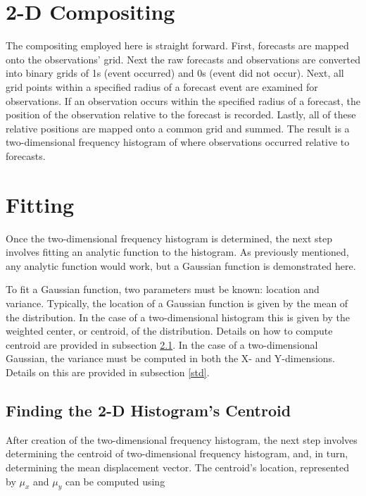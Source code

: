 \section{2-D Compositing}
\label{compositing}

The compositing employed here is straight forward.
First, forecasts are mapped onto the observations' grid.
Next the raw forecasts and observations are converted into binary grids of 1s (event occurred) and 0s (event did not occur).
Next, all grid points within a specified radius of a forecast event are examined for observations.
If an observation occurs within the specified radius of a forecast, the position of the observation relative to the forecast is recorded.
Lastly, all of these relative positions are mapped onto a common grid and summed.
The result is a two-dimensional frequency histogram of where observations occurred relative to forecasts.




\section{Fitting}
\label{fitting}

Once the two-dimensional frequency histogram is determined, the next step involves fitting an analytic function to the histogram.
As previously mentioned, any analytic function would work, but a Gaussian function is demonstrated here.

To fit a Gaussian function, two parameters must be known: location and variance.
Typically, the location of a Gaussian function is given by the mean of the distribution.
In the case of a two-dimensional histogram this is given by the weighted center, or centroid, of the distribution.
Details on how to compute centroid are provided in subsection \ref{centroid}.
In the case of a two-dimensional Gaussian, the variance must be computed in both the X- and Y-dimensions.
Details on this are provided in subsection \ref{std}.




\subsection{Finding the 2-D Histogram's Centroid}
\label{centroid}

After creation of the two-dimensional frequency histogram, the next step involves determining the centroid of two-dimensional frequency histogram, and, in turn, determining the mean displacement vector.
The centroid's location, represented by $\mu_x$ and $\mu_y$ can be computed using

